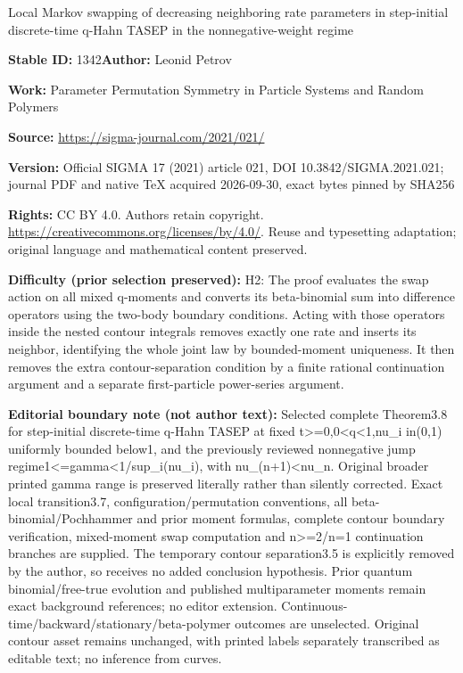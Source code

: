 \documentclass[11pt]{article}
\numberwithin{equation}{section}
\numberwithin{equation}{section}
\begin{document}
\begin{center}\Large Local Markov swapping of decreasing neighboring rate parameters in step-initial discrete-time q-Hahn TASEP in the nonnegative-weight regime\end{center}
\noindent\textbf{Stable ID:} 1342\quad\textbf{Author:} Leonid Petrov\par
\noindent\textbf{Work:} Parameter Permutation Symmetry in Particle Systems and Random Polymers\par
\noindent\textbf{Source:} \url{https://sigma-journal.com/2021/021/}\par
\noindent\textbf{Version:} Official SIGMA 17 (2021) article 021, DOI 10.3842/SIGMA.2021.021; journal PDF and native TeX acquired 2026-09-30, exact bytes pinned by SHA256\par
\noindent\textbf{Rights:} CC BY 4.0. Authors retain copyright. \url{https://creativecommons.org/licenses/by/4.0/}. Reuse and typesetting adaptation; original language and mathematical content preserved.\par
\noindent\textbf{Difficulty (prior selection preserved):} {\CJKfont H2: The proof evaluates the swap action on all mixed q-moments and converts its beta-binomial sum into difference operators using the two-body boundary conditions. Acting with those operators inside the nested contour integrals removes exactly one rate and inserts its neighbor, identifying the whole joint law by bounded-moment uniqueness. It then removes the extra contour-separation condition by a finite rational continuation argument and a separate first-particle power-series argument.}\par
\medskip\noindent\textbf{Editorial boundary note (not author text):} Selected complete Theorem3.8 for step-initial discrete-time q-Hahn TASEP at fixed t>=0,0<q<1,nu\_i in(0,1) uniformly bounded below1, and the previously reviewed nonnegative jump regime1<=gamma<1/sup\_i(nu\_i), with nu\_(n+1)<nu\_n. Original broader printed gamma range is preserved literally rather than silently corrected. Exact local transition3.7, configuration/permutation conventions, all beta-binomial/Pochhammer and prior moment formulas, complete contour boundary verification, mixed-moment swap computation and n>=2/n=1 continuation branches are supplied. The temporary contour separation3.5 is explicitly removed by the author, so receives no added conclusion hypothesis. Prior quantum binomial/free-true evolution and published multiparameter moments remain exact background references; no editor extension. Continuous-time/backward/stationary/beta-polymer outcomes are unselected. Original contour asset remains unchanged, with printed labels separately transcribed as editable text; no inference from curves.\par
\end{document}
